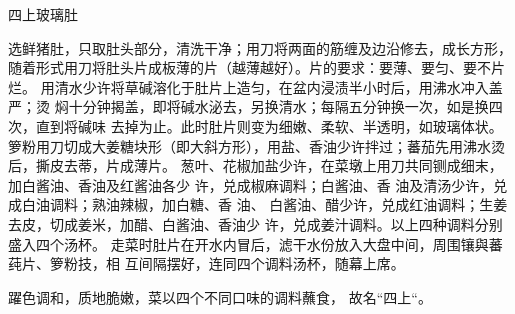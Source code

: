\begin{recipe}{四上玻璃肚}

\ingredients


\cooking

\step 选鲜猪肚，只取肚头部分，清洗干净；用刀将两面的筋缠及边沿修去，成长方形，
随着形式用刀将肚头片成板薄的片（越薄越好）。片的要求：要薄、要匀、要不片烂。
\step 用清水少许将草碱溶化于肚片上造匀，在盆内浸渍半小时后，用沸水冲入盖严；烫
焖十分钟揭盖，即将碱水泌去，另换清水；每隔五分钟换一次，如是换四次，直到将碱味
去掉为止。此时肚片则变为细嫩、柔软、半透明，如玻璃体状。
\step 箩粉用刀切成大姜糖块形（即大斜方形），用盐、香油少许拌过；蕃茄先用沸水烫
后，撕皮去蒂，片成薄片。
\step 葱叶、花椒加盐少许，在菜墩上用刀共同铡成细末，加白酱油、香油及红酱油各少
许，兑成椒麻调料；白酱油、香 油及清汤少许，兑成白油调料；熟油辣椒，加白糖、香
油、 白酱油、醋少许，兑成红油调料；生姜去皮，切成姜米，加醋、白酱油、香油少
许，兑成姜汁调料。以上四种调料分别 盛入四个汤杯。
\step 走菜时肚片在开水内冒后，滤干水份放入大盘中间，周围镶與蕃莼片、箩粉技，相
互间隔摆好，连同四个调料汤杯，随幕上席。

\notes

躍色调和，质地脆嫩，菜以四个不同口味的调料蘸食， 故名“四上“。

\end{recipe}


